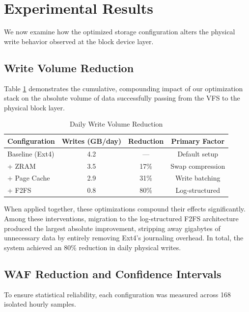 \documentclass[conference]{IEEEtran}
\begin{document}
\section{Experimental Results}

We now examine how the optimized storage configuration alters the physical write behavior observed at the block device layer.

\subsection{Write Volume Reduction}
Table \ref{tab:writes} demonstrates the cumulative, compounding impact of our optimization stack on the absolute volume of data successfully passing from the VFS to the physical block layer.

\begin{table}[htbp]
\caption{Daily Write Volume Reduction}
\begin{center}
\begin{tabular}{@{}lccc@{}}
\toprule
\textbf{Configuration} & \textbf{Writes (GB/day)} & \textbf{Reduction} & \textbf{Primary Factor} \\
\midrule
Baseline (Ext4) & 4.2 & --- & Default setup \\
+ ZRAM & 3.5 & 17\% & Swap compression \\
+ Page Cache & 2.9 & 31\% & Write batching \\
+ F2FS & 0.8 & 80\% & Log-structured \\
\bottomrule
\end{tabular}
\end{center}
\label{tab:writes}
\end{table}

When applied together, these optimizations compound their effects significantly. Among these interventions, migration to the log-structured F2FS architecture produced the largest absolute improvement, stripping away gigabytes of unnecessary data by entirely removing Ext4's journaling overhead. In total, the system achieved an 80\% reduction in daily physical writes.

\subsection{WAF Reduction and Confidence Intervals}

To ensure statistical reliability, each configuration was measured across 168 isolated hourly samples.
\end{document}
